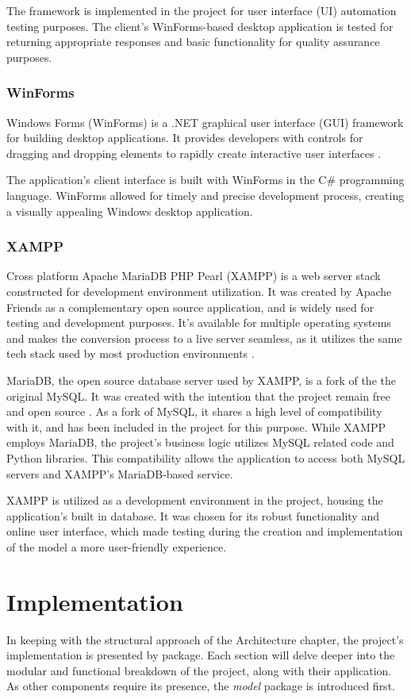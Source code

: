 \documentclass{thesis-ekf}
\theoremstyle{definition}
\theoremstyle{remark}
\begin{document}
The framework is implemented in the project for user interface (UI) automation testing purposes. The client's WinForms-based desktop application is tested for returning appropriate responses and basic functionality for quality assurance purposes.

\subsection{WinForms} \label{winform}
Windows Forms (WinForms) is a .NET graphical user interface (GUI) framework for building desktop applications. It provides developers with controls for dragging and dropping elements to rapidly create interactive user interfaces \cite{winforms}.

The application's client interface is built with WinForms in the C\# programming language. WinForms allowed for timely and precise development process, creating a visually appealing Windows desktop application.

\subsection{XAMPP}
Cross platform Apache MariaDB PHP Pearl (XAMPP) is a web server stack constructed for development environment utilization. It was created by Apache Friends as a complementary open source application, and is widely used for testing and development purposes. It's available for multiple operating systems and makes the conversion process to a live server seamless, as it utilizes the same tech stack used by most production environments \cite{wiki-xampp}.

MariaDB, the open source database server used by XAMPP, is a fork of the the original MySQL. It was created with the intention that the project remain free and open source \cite{mariaDB}. As a fork of MySQL, it shares a high level of compatibility with it, and has been included in the project for this purpose. While XAMPP employs MariaDB, the project's business logic utilizes MySQL related code and Python libraries. This compatibility allows the application to access both MySQL servers and XAMPP's MariaDB-based service.

XAMPP is utilized as a development environment in the project, housing the application's built in database. It was chosen for its robust functionality and online user interface, which made testing during the creation and implementation of the model a more user-friendly experience. 


\chapter{Implementation}
In keeping with the structural approach of the Architecture chapter, the project's implementation is presented by package. Each section will delve deeper into the modular and functional breakdown of the project, along with their application. As other components require its presence, the \emph{model} package is introduced first.
\end{document}
